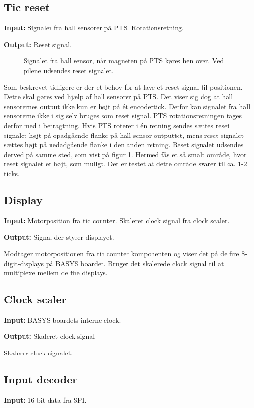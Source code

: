 \subsection*{Tic reset}
\textbf{Input:} Signaler fra hall sensorer på PTS. Rotationsretning.

\textbf{Output:} Reset signal.

\begin{figure}[!th]
\centering

\caption[Signal fra hall sensor]{Signalet fra hall sensor, når magneten på PTS køres hen over. Ved pilene udsendes reset signalet.}
\label{fig:hall_sensor_signal}
\end{figure}

Som beskrevet tidligere er der et behov for at lave et reset signal til positionen. 
Dette skal gøres ved hjælp af hall sensorer på PTS. 
Det viser sig dog at hall sensorernes output ikke kun er højt på ét encodertick. 
Derfor kan signalet fra hall sensorerne ikke i sig selv bruges som reset signal.
PTS rotationsretningen tages derfor med i betragtning.
Hvis PTS roterer i én retning sendes sættes reset signalet højt på opadgående 
flanke på hall sensor outputtet, mens reset signalet sættes højt på nedadgående 
flanke i den anden retning. Reset signalet udsendes derved på samme sted, som vist på figur \ref{fig:hall_sensor_signal}.
Hermed fås et så smalt område, hvor reset signalet er højt, som muligt. 
Det er testet at dette område svarer til ca. 1-2 ticks.

\subsection*{Display}
\textbf{Input:} Motorposition fra tic counter. Skaleret clock signal fra clock 
scaler.

\textbf{Output:} Signal der styrer displayet.

Modtager motorpositionen fra tic counter komponenten og viser det på de fire 8-digit-displays 
på BASYS boardet. Bruger det skalerede clock signal til at multiplexe mellem de 
fire displays.

\subsection*{Clock scaler}
\textbf{Input:} BASYS boardets interne clock.

\textbf{Output:} Skaleret clock signal

Skalerer clock signalet.

\subsection*{Input decoder}
\textbf{Input:} 16 bit data fra SPI.

